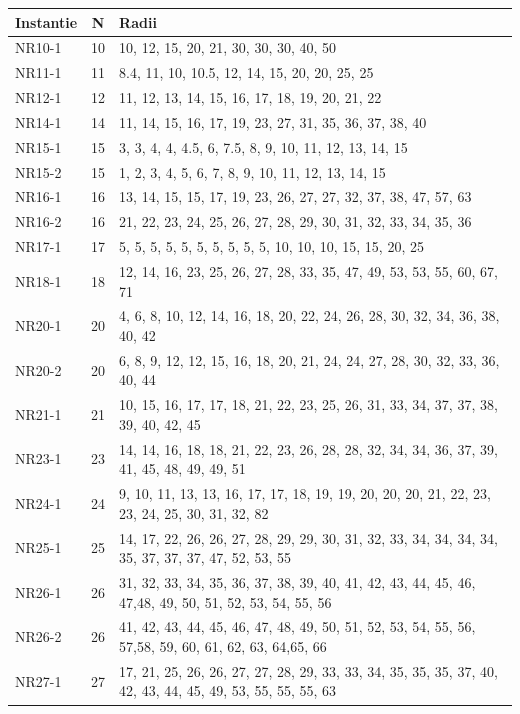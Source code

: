 \documentclass[12pt,a4paper,oneside]{book}
\begin{document}
{\begin{tabularx}{\textwidth}{ l c X }
\caption{Packomania Benchmark Verdelingen}
\\\toprule
Instantie & N & Radii \\
\midrule
\endhead
NR10-1 & 10 & 10, 12, 15, 20, 21, 30, 30, 30, 40, 50 \\
NR11-1 & 11 & 8.4, 11, 10, 10.5, 12, 14, 15, 20, 20, 25, 25 \\
NR12-1 & 12 & 11, 12, 13, 14, 15, 16, 17, 18, 19, 20, 21, 22 \\
NR14-1 & 14 & 11, 14, 15, 16, 17, 19, 23, 27, 31, 35, 36, 37, 38, 40 \\
NR15-1 & 15 & 3, 3, 4, 4, 4.5, 6, 7.5, 8, 9, 10, 11, 12, 13, 14, 15 \\
NR15-2 & 15 & 1, 2, 3, 4, 5, 6, 7, 8, 9, 10, 11, 12, 13, 14, 15 \\
NR16-1 & 16 & 13, 14, 15, 15, 17, 19, 23, 26, 27, 27, 32, 37, 38, 47, 57, 63 \\
NR16-2 & 16 & 21, 22, 23, 24, 25, 26, 27, 28, 29, 30, 31, 32, 33, 34, 35, 36 \\
NR17-1 & 17 & 5, 5, 5, 5, 5, 5, 5, 5, 5, 5, 10, 10, 10, 15, 15, 20, 25 \\
NR18-1 & 18 & 12, 14, 16, 23, 25, 26, 27, 28, 33, 35, 47, 49, 53, 53, 55, 60, 67, 71 \\
NR20-1 & 20 & 4, 6, 8, 10, 12, 14, 16, 18, 20, 22, 24, 26, 28, 30, 32, 34, 36, 38, 40, 42 \\
NR20-2 & 20 & 6, 8, 9, 12, 12, 15, 16, 18, 20, 21, 24, 24, 27, 28, 30, 32, 33, 36, 40, 44 \\
NR21-1 & 21 & 10, 15, 16, 17, 17, 18, 21, 22, 23, 25, 26, 31, 33, 34, 37, 37, 38, 39, 40, 42, 45 \\
NR23-1 & 23 & 14, 14, 16, 18, 18, 21, 22, 23, 26, 28, 28, 32, 34, 34, 36, 37, 39, 41, 45, 48, 49, 49, 51 \\
NR24-1 & 24 & 9, 10, 11, 13, 13, 16, 17, 17, 18, 19, 19, 20, 20, 20, 21, 22, 23, 23, 24, 25, 30, 31, 32, 82 \\
NR25-1 & 25 & 14, 17, 22, 26, 26, 27, 28, 29, 29, 30, 31, 32, 33, 34, 34, 34, 34, 35, 37, 37, 37, 47, 52, 53, 55 \\
NR26-1 & 26 & 31, 32, 33, 34, 35, 36, 37, 38, 39, 40, 41, 42, 43, 44, 45, 46, 47,48, 49, 50, 51, 52, 53, 54, 55, 56 \\
NR26-2 & 26 & 41, 42, 43, 44, 45, 46, 47, 48, 49, 50, 51, 52, 53, 54, 55, 56, 57,58, 59, 60, 61, 62, 63, 64,65, 66 \\
NR27-1 & 27 & 17, 21, 25, 26, 26, 27, 27, 28, 29, 33, 33, 34, 35, 35, 35, 37, 40, 42, 43, 44, 45, 49, 53, 55, 55, 55, 63 \\

\end{tabularx}}
\end{document}
